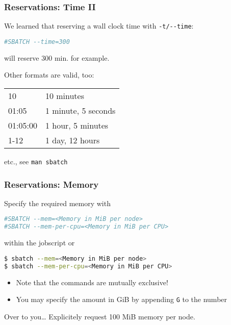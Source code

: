 \begin{frame}[fragile]
 \frametitle{Reservations: Time II}
  We learned that reserving a wall clock time with \verb+-t/--time+:
  \begin{lstlisting}[language=Bash, style=Shell]
#SBATCH --time=300 
  \end{lstlisting}
  will reserve 300 min. for example.\pause
  \begin{block}{Other formats are valid, too:}
    \begin{center}
      \begin{tabular}{l|l}
        10 & 10 minutes\\
        01:05 & 1 minute, 5 seconds\\
        01:05:00 & 1 hour, 5 minutes\\
        1-12 & 1 day, 12 hours
      \end{tabular}
      \newline etc., see \verb+man sbatch+
    \end{center}
  \end{block}
\end{frame}

\begin{frame}[fragile]
  \frametitle{Reservations: Memory}
  \vspace{-1em}
  Specify the required memory with
\begin{lstlisting}[language=Bash,style=Shell]
#SBATCH --mem=<Memory in MiB per node>
#SBATCH --mem-per-cpu=<Memory in MiB per CPU>
\end{lstlisting}
within the jobscript or
\begin{lstlisting}[language=Bash,style=Shell]
$ sbatch --mem=<Memory in MiB per node>
$ sbatch --mem-per-cpu=<Memory in MiB per CPU> 
\end{lstlisting}
\vspace{-.5em}
\begin{itemize}
\item Note that the commands are mutually exclusive!
\item You may specify the amount in GiB by appending \verb+G+ to the number
\end{itemize}
\vspace{-.5em}
\begin{block}{Over to you\ldots}
  Explicitely request 100 MiB memory per node.
\end{block}
  \vfill
\end{frame}

